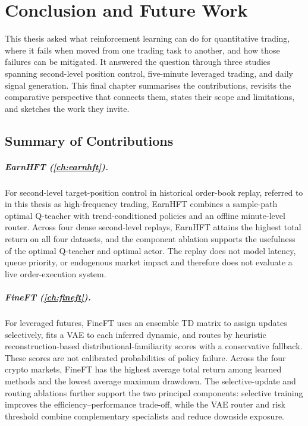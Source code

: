 
\chapter{Conclusion and Future Work} %
\label{ch:conclusion}

This thesis asked what reinforcement learning can do for quantitative trading, where it fails when moved from one trading task to another, and how those failures can be mitigated. It answered the question through three studies spanning second-level position control, five-minute leveraged trading, and daily signal generation. This final chapter summarises the contributions, revisits the comparative perspective that connects them, states their scope and limitations, and sketches the work they invite.

\section{Summary of Contributions}
\label{sec:concl_summary}

\paragraph{EarnHFT (\cref{ch:earnhft}).} For second-level target-position control in historical order-book replay, referred to in this thesis as high-frequency trading, EarnHFT combines a sample-path optimal Q-teacher with trend-conditioned policies and an offline minute-level router. Across four dense second-level replays, EarnHFT attains the highest total return on all four datasets, and the component ablation supports the usefulness of the optimal Q-teacher and optimal actor. The replay does not model latency, queue priority, or endogenous market impact and therefore does not evaluate a live order-execution system.

\paragraph{FineFT (\cref{ch:fineft}).} For leveraged futures, FineFT uses an ensemble TD matrix to assign updates selectively, fits a VAE to each inferred dynamic, and routes by heuristic reconstruction-based distributional-familiarity scores with a conservative fallback. These scores are not calibrated probabilities of policy failure. Across the four crypto markets, FineFT has the highest average total return among learned methods and the lowest average maximum drawdown. The selective-update and routing ablations further support the two principal components: selective training improves the efficiency--performance trade-off, while the VAE router and risk threshold combine complementary specialists and reduce downside exposure.

